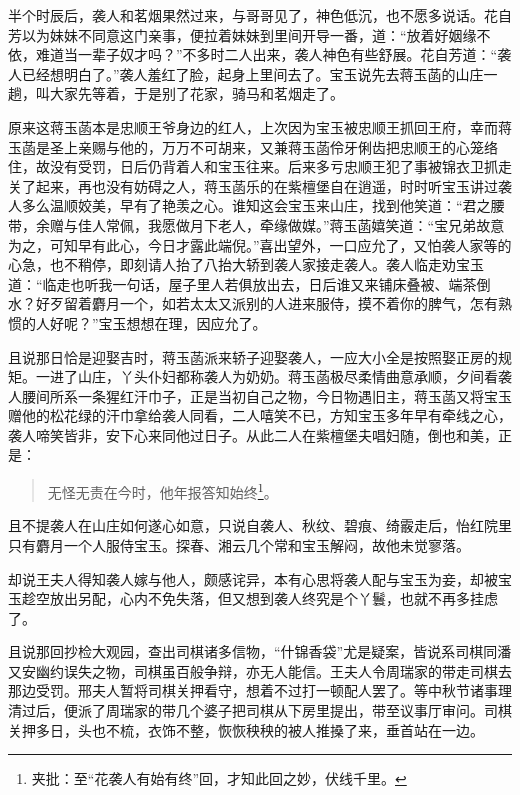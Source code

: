 \documentclass[12pt,oneside]{book}
\newenvironment{shici}{%
\begin{verse}%
\centering\large\hspace{12pt}}%
{\end{verse}}
\begin{document}
半个时辰后，袭人和茗烟果然过来，与哥哥见了，神色低沉，也不愿多说话。花自芳以为妹妹不同意这门亲事，便拉着妹妹到里间开导一番，道：“放着好姻缘不依，难道当一辈子奴才吗？”不多时二人出来，袭人神色有些舒展。花自芳道：“袭人已经想明白了。”袭人羞红了脸，起身上里间去了。宝玉说先去蒋玉菡的山庄一趟，叫大家先等着，于是别了花家，骑马和茗烟走了。

原来这蒋玉菡本是忠顺王爷身边的红人，上次因为宝玉被忠顺王抓回王府，幸而蒋玉菡是圣上亲赐与他的，万万不可胡来，又兼蒋玉菡伶牙俐齿把忠顺王的心笼络住，故没有受罚，日后仍背着人和宝玉往来。后来多亏忠顺王犯了事被锦衣卫抓走关了起来，再也没有妨碍之人，蒋玉菡乐的在紫檀堡自在逍遥，时时听宝玉讲过袭人多么温顺姣美，早有了艳羡之心。谁知这会宝玉来山庄，找到他笑道：“君之腰带，余赠与佳人常佩，我愿做月下老人，牵缘做媒。”蒋玉菡嬉笑道：“宝兄弟故意为之，可知早有此心，今日才露此端倪。”喜出望外，一口应允了，又怕袭人家等的心急，也不稍停，即刻请人抬了八抬大轿到袭人家接走袭人。袭人临走劝宝玉道：“临走也听我一句话，屋子里人若俱放出去，日后谁又来铺床叠被、端茶倒水？好歹留着麝月一个，如若太太又派别的人进来服侍，摸不着你的脾气，怎有熟惯的人好呢？”宝玉想想在理，因应允了。

且说那日恰是迎娶吉时，蒋玉菡派来轿子迎娶袭人，一应大小全是按照娶正房的规矩。一进了山庄，丫头仆妇都称袭人为奶奶。蒋玉菡极尽柔情曲意承顺，夕间看袭人腰间所系一条猩红汗巾子，正是当初自己之物，今日物遇旧主，蒋玉菡又将宝玉赠他的松花绿的汗巾拿给袭人同看，二人嘻笑不已，方知宝玉多年早有牵线之心，袭人啼笑皆非，安下心来同他过日子。从此二人在紫檀堡夫唱妇随，倒也和美，正是：

\begin{shici}
无怪无责在今时，他年报答知始终\footnote{夹批：至“花袭人有始有终”回，才知此回之妙，伏线千里。}。
\end{shici}

且不提袭人在山庄如何遂心如意，只说自袭人、秋纹、碧痕、绮霰走后，怡红院里只有麝月一个人服侍宝玉。探春、湘云几个常和宝玉解闷，故他未觉寥落。

却说王夫人得知袭人嫁与他人，颇感诧异，本有心思将袭人配与宝玉为妾，却被宝玉趁空放出另配，心内不免失落，但又想到袭人终究是个丫鬟，也就不再多挂虑了。

且说那回抄检大观园，查出司棋诸多信物，“什锦香袋”尤是疑案，皆说系司棋同潘又安幽约误失之物，司棋虽百般争辩，亦无人能信。王夫人令周瑞家的带走司棋去那边受罚。邢夫人暂将司棋关押看守，想着不过打一顿配人罢了。等中秋节诸事理清过后，便派了周瑞家的带几个婆子把司棋从下房里提出，带至议事厅审问。司棋关押多日，头也不梳，衣饰不整，恢恢秧秧的被人推搡了来，垂首站在一边。
\end{document}
